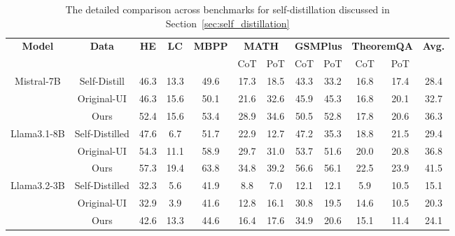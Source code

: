 \begin{table}[]
\centering
\begin{tabular}{cccccccccccc}
\hline
\multirow{2}{*}{\textbf{Model}} &
  \multirow{2}{*}{\textbf{Data}} &
  \multirow{2}{*}{\textbf{HE}} &
  \multirow{2}{*}{\textbf{LC}} &
  \multirow{2}{*}{\textbf{MBPP}} &
  \multicolumn{2}{c}{\textbf{MATH}} &
  \multicolumn{2}{c}{\textbf{GSMPlus}} &
  \multicolumn{2}{c}{\textbf{TheoremQA}} &
  \multirow{2}{*}{\textbf{Avg.}} \\ \cline{6-11}
                             &                &      &      &      & CoT  & PoT  & CoT  & PoT  & CoT  & PoT  &      \\ \hline
\multirow{3}{*}{Mistral-7B}  & Self-Distill   & 46.3 & 13.3 & 49.6 & 17.3 & 18.5 & 43.3 & 33.2 & 16.8 & 17.4 & 28.4 \\
                             & Original-UI    & 46.3 & 15.6 & 50.1 & 21.6 & 32.6 & 45.9 & 45.3 & 16.8 & 20.1 & 32.7 \\
                             & Ours           & 52.4 & 15.6 & 53.4 & 28.9 & 34.6 & 50.5 & 52.8 & 17.8 & 20.6 & 36.3 \\ \hline
\multirow{3}{*}{Llama3.1-8B} & Self-Distilled & 47.6 & 6.7  & 51.7 & 22.9 & 12.7 & 47.2 & 35.3 & 18.8 & 21.5 & 29.4 \\
                             & Original-UI    & 54.3 & 11.1 & 58.9 & 29.7 & 31.0 & 53.7 & 51.6 & 20.0 & 20.8 & 36.8 \\
                             & Ours           & 57.3 & 19.4 & 63.8 & 34.8 & 39.2 & 56.6 & 56.1 & 22.5 & 23.9 & 41.5 \\ \hline
\multirow{3}{*}{Llama3.2-3B} & Self-Distilled & 32.3 & 5.6  & 41.9 & 8.8  & 7.0  & 12.1 & 12.1 & 5.9  & 10.5 & 15.1 \\
                             & Original-UI    & 32.9 & 3.9  & 41.6 & 12.8 & 16.1 & 30.8 & 19.5 & 14.6 & 10.5 & 20.3 \\
                             & Ours           & 42.6 & 13.3 & 44.6 & 16.4 & 17.6 & 34.9 & 20.6 & 15.1 & 11.4 & 24.1 \\ \hline
\end{tabular}
\caption{The detailed comparison across benchmarks for self-distillation discussed in Section~\ref{sec:self_distillation}}
\end{table}